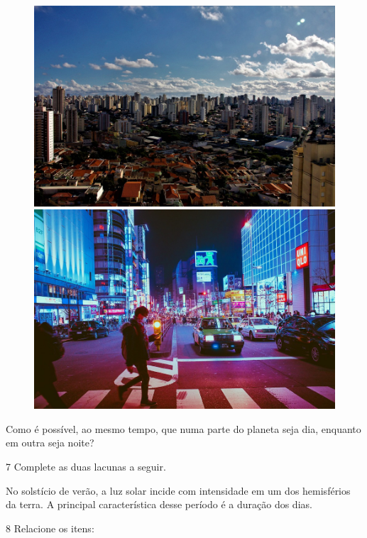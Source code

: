 \begin{figure}[htpb!]
\includegraphics[width=.5\textwidth]{./imgs/img4.png}
\includegraphics[width=.5\textwidth]{./imgs/img5.png}
\end{figure}

\noindent{}Como é possível, ao mesmo tempo, que numa parte do planeta seja dia,
enquanto em outra seja noite?


\num{7} Complete as duas lacunas a seguir.

No solstício de verão, a luz solar incide com  intensidade em um dos hemisférios da terra. A principal característica desse período é a  duração dos dias.

\num{8} Relacione os itens:

